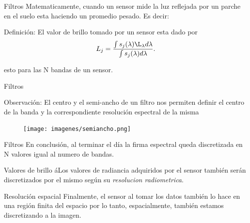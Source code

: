 \documentclass[]{beamer}
\begin{document}
\begin{frame}{Filtros}
  Matematicamente, cuando un sensor mide la luz reflejada por un parche en el suelo esta haciendo un promedio pesado. Es decir:
  \begin{block}{Definición:}
    El valor de brillo tomado por un sensor esta dado por
    \begin{equation}
        L_{j} =\frac{\int s_j(\lambda) \L_\lambda d\lambda}{\int s_j(\lambda) d\lambda}.
    \end{equation}
  \end{block}
  esto para las N bandas de un sensor.
\end{frame}

\begin{frame}{Filtros}
  \begin{block}{Observación:}
    El centro y el semi-ancho de un filtro nos permiten definir el centro de la banda y la correspondiente resolución espectral de la misma
  \end{block}
  \begin{figure}
    \texttt{[image: imagenes/semiancho.png]}
  \end{figure}
\end{frame}

\begin{frame}{Filtros}
  En conclusión, al terminar el día la firma espectral queda discretizada en N valores igual al numero de bandas.
\end{frame}

\begin{frame}{Valores de brillo}
  áLos valores de radiancia adquiridos por el sensor también serán discretizados por el mismo según su \emph{resolucion radiometrica}.
\end{frame}

\begin{frame}{Resolución espacial}
  Finalmente, el sensor al tomar los datos también lo hace en una región finita del espacio por lo tanto, espacialmente, también estamos discretizando a la imagen.
\end{frame}
\end{document}
